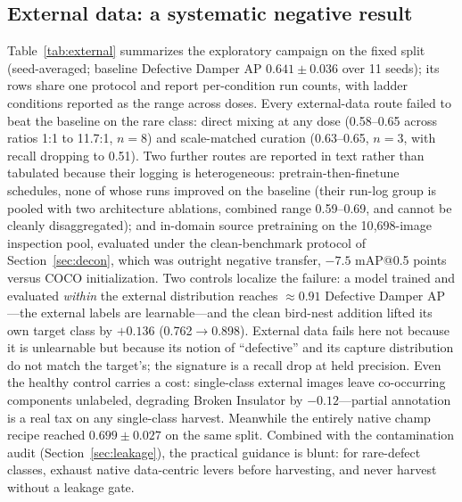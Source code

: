 \documentclass[conference]{IEEEtran}
\makeatletter
\newcommand{\dd}{Defective Damper}
\newcommand{\map}{mAP@0.5}
\makeatother
\begin{document}
\subsection{External data: a systematic negative result}
\label{sec:external}
Table~\ref{tab:external} summarizes the exploratory campaign on the fixed split (seed-averaged; baseline \dd{} AP $0.641\pm0.036$ over 11 seeds); its rows share one protocol and report per-condition run counts, with ladder conditions reported as the range across doses. Every external-data route failed to beat the baseline on the rare class: direct mixing at any dose (0.58--0.65 across ratios 1:1 to 11.7:1, $n{=}8$) and scale-matched curation (0.63--0.65, $n{=}3$, with recall dropping to 0.51). Two further routes are reported in text rather than tabulated because their logging is heterogeneous: pretrain-then-finetune schedules, none of whose runs improved on the baseline (their run-log group is pooled with two architecture ablations, combined range 0.59--0.69, and cannot be cleanly disaggregated); and in-domain source pretraining on the 10{,}698-image inspection pool, evaluated under the clean-benchmark protocol of Section~\ref{sec:decon}, which was outright negative transfer, $-7.5$ \map{} points versus COCO initialization. Two controls localize the failure: a model trained and evaluated \emph{within} the external distribution reaches ${\approx}0.91$ \dd{} AP---the external labels are learnable---and the clean bird-nest addition lifted its own target class by $+0.136$ (0.762$\to$0.898). External data fails here not because it is unlearnable but because its notion of ``defective'' and its capture distribution do not match the target's; the signature is a recall drop at held precision. Even the healthy control carries a cost: single-class external images leave co-occurring components unlabeled, degrading Broken Insulator by $-0.12$---partial annotation is a real tax on any single-class harvest. Meanwhile the entirely native champ recipe reached $0.699\pm0.027$ on the same split. Combined with the contamination audit (Section~\ref{sec:leakage}), the practical guidance is blunt: for rare-defect classes, exhaust native data-centric levers before harvesting, and never harvest without a leakage gate.
\end{document}
